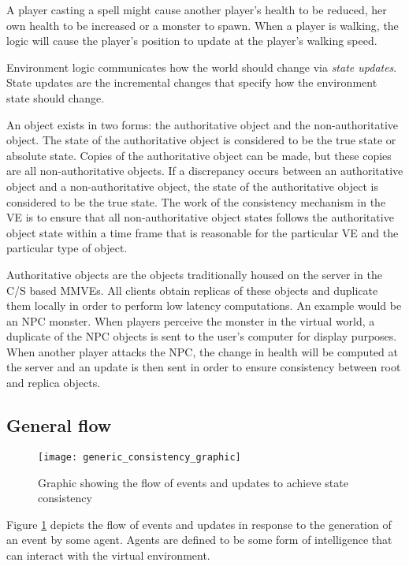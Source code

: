 A player casting a spell might cause another player's health to be reduced, her own health to be increased or a monster to spawn. When a player is walking, the logic will cause the player's position to update at the player's walking speed.

Environment logic communicates how the world should change via \emph{state updates}. State updates are the incremental changes that specify how the environment state should change.

An object exists in two forms: the authoritative object and the non-authoritative object. The state of the authoritative object is considered to be the true state or absolute state. Copies of the authoritative object can be made, but these copies are all non-authoritative objects. If a discrepancy occurs between an authoritative object and a non-authoritative object, the state of the authoritative object is considered to be the true state. The work of the consistency mechanism in the VE is to ensure that all non-authoritative object states follows the authoritative object state within a time frame that is reasonable for the particular VE and the particular type of object.

Authoritative objects are the objects traditionally housed on the server in the C/S based MMVEs. All clients obtain replicas of these objects and duplicate them locally in order to perform low latency computations. An example would be an NPC monster. When players perceive the monster in the virtual world, a duplicate of the NPC objects is sent to the user's computer for display purposes. When another player attacks the NPC, the change in health will be computed at the server and an update is then sent in order to ensure consistency between root and replica objects.

\subsection{General flow}
\label{general_flow}

\begin{figure}[htbp]
 \centering
 \texttt{[image: generic\_consistency\_graphic]}
 \caption{Graphic showing the flow of events and updates to achieve state consistency}
 \label{fig_event_update_flow_graphic}
\end{figure}

Figure \ref{fig_event_update_flow_graphic} depicts the flow of events and updates in response to the generation of an event by some agent. Agents are defined to be some form of intelligence that can interact with the virtual environment.

